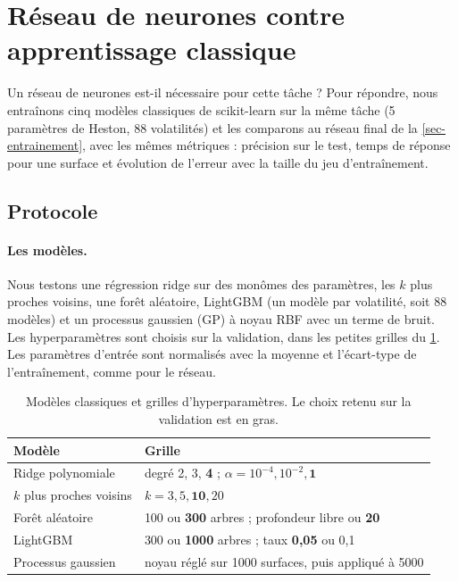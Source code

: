
\section{Réseau de neurones contre apprentissage classique}
\label{sec-dl-vs-ml}

Un réseau de neurones est-il nécessaire pour cette tâche ? Pour répondre, nous entraînons cinq modèles classiques
de scikit-learn sur la même tâche (5 paramètres de Heston, 88 volatilités) et les comparons au réseau final de la
\cref{sec-entrainement}, avec les mêmes métriques : précision sur le test, temps de réponse pour une surface et
évolution de l'erreur avec la taille du jeu d'entraînement.

\subsection{Protocole}
\label{sec-ml-protocole}

\paragraph{Les modèles.} Nous testons une régression ridge sur des monômes des paramètres, les $k$ plus proches
voisins, une forêt aléatoire, LightGBM (un modèle par volatilité, soit 88 modèles) et un processus gaussien (GP)
à noyau RBF avec un terme de bruit. Les hyperparamètres sont choisis sur la validation, dans les petites grilles du
\cref{tab-ml-grilles}. Les paramètres d'entrée sont normalisés avec la moyenne et l'écart-type de l'entraînement,
comme pour le réseau.

\begin{table}[H]
  \centering
  \caption{Modèles classiques et grilles d'hyperparamètres. Le choix retenu sur la validation est en gras.}
  \label{tab-ml-grilles}
  \small
  \begin{tabular}{ll}
    \toprule
    Modèle & Grille \\
    \midrule
    Ridge polynomiale   & degré 2, 3, \textbf{4} ; $\alpha = 10^{-4}, 10^{-2}, \mathbf{1}$ \\
    $k$ plus proches voisins & $k = 3, 5, \mathbf{10}, 20$ \\
    Forêt aléatoire     & 100 ou \textbf{300} arbres ; profondeur libre ou \textbf{20} \\
    LightGBM            & 300 ou \textbf{1000} arbres ; taux \textbf{0,05} ou 0,1 \\
    Processus gaussien  & noyau réglé sur \num{1000} surfaces, puis appliqué à \num{5000} \\
    \bottomrule
  \end{tabular}
\end{table}

